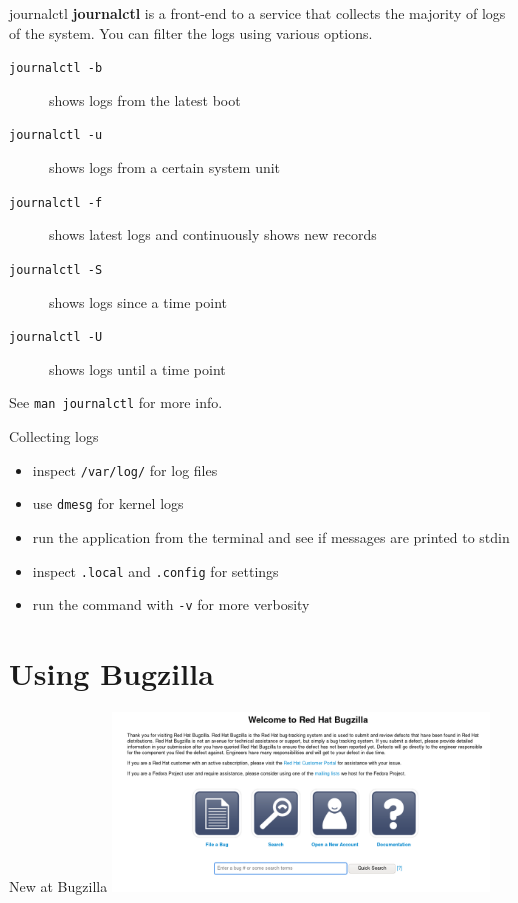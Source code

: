 \documentclass[12pt]{beamer}
\begin{document}
\begin{frame}{journalctl}
\textbf{journalctl} is a front-end to a service that collects the majority of logs of the system. You can filter the logs using various options.
\begin{description}
	\item[\texttt{journalctl -b}] shows logs from the latest boot
	\item[\texttt{journalctl -u}] shows logs from a certain system unit
	\item[\texttt{journalctl -f}] shows latest logs and continuously shows new records
	\item[\texttt{journalctl -S}] shows logs since a time point
	\item[\texttt{journalctl -U}] shows logs until a time point
\end{description}

\vspace{5pt}

See {\color{blue}\texttt{man journalctl}} for more info.
\end{frame}

\begin{frame}{Collecting logs}
\begin{itemize}
	\item inspect {\color{blue} \texttt{/var/log/}} for log files 
	\item use {\color{blue} \texttt{dmesg}} for kernel logs 
	\item run the application from the terminal and see if messages are printed to stdin
	\item inspect {\color{blue} \texttt{.local}} and {\color{blue} \texttt{.config}} for settings 
	\item run the command with {\color{blue} \texttt{-v}} for more verbosity
\end{itemize}	
\end{frame}

\section{Using Bugzilla}
\begin{frame}{New at Bugzilla}
\includegraphics[width=10cm]{images/bz_new.png}
\end{frame}
\end{document}

